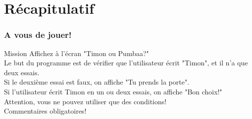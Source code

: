 \documentclass[handout]{beamer}
\begin{document}
\section{Récapitulatif}

\begin{frame}
\frametitle{A vous de jouer!}
\begin{block}{Mission}
    Affichez à l'écran "Timon ou Pumbaa?"\\
Le but du programme est de vérifier que l'utilisateur écrit "Timon", et il n'a que deux essais.\\
Si le deuxième essai est faux, on affiche "Tu prends la porte".\\
Si l'utilisateur écrit Timon en un ou deux essais, on affiche "Bon choix!"\\
Attention, vous ne pouvez utiliser que des conditions!\\
Commentaires obligatoires!
\end{block}
\end{frame}
\end{document}
